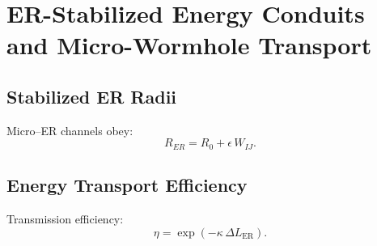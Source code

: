 \chapter{ER-Stabilized Energy Conduits and Micro-Wormhole Transport}

\section{Stabilized ER Radii}
Micro–ER channels obey:
\[
R_{ER} = R_0 + \epsilon\, W_{IJ}.
\]

\section{Energy Transport Efficiency}
Transmission efficiency:
\[
\eta = \exp(-\kappa\, \Delta L_{\mathrm{ER}}).
\]

